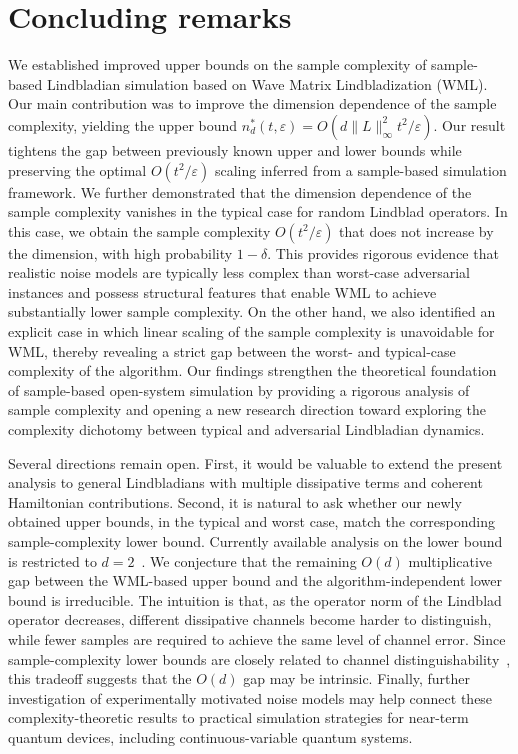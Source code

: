 \documentclass[superscriptaddress,amsmath,amssymb,aps,pra,letterpaper,tightenlines,notitlepages,12pt]{revtex4-2}
\begin{document}
\section{Concluding remarks} \label{sec:conclusion}
We established improved upper bounds on the sample complexity of sample-based Lindbladian simulation based on Wave Matrix Lindbladization (WML). Our main contribution was to improve the dimension dependence of the sample complexity, yielding the upper bound $n^\ast_d(t, \varepsilon) = O(d \| L\|_\infty^2 t^2/\varepsilon)$. Our result tightens the gap between previously known upper and lower bounds while preserving the optimal $O(t^2/\varepsilon)$ scaling inferred from a sample-based simulation framework. We further demonstrated that the dimension dependence of the sample complexity vanishes in the typical case for random Lindblad operators. In this case, we obtain the sample complexity $O(t^2/\varepsilon)$ that does not increase by the dimension, with high probability $1-\delta$. This provides rigorous evidence that realistic noise models are typically less complex than worst-case adversarial instances and possess structural features that enable WML to achieve substantially lower sample complexity. On the other hand, we also identified an explicit case in which linear scaling of the sample complexity is unavoidable for WML, thereby revealing a strict gap between the worst- and typical-case complexity of the algorithm. Our findings strengthen the theoretical foundation of sample-based open-system simulation by providing a rigorous analysis of sample complexity and opening a new research direction toward exploring the complexity dichotomy between typical and adversarial Lindbladian dynamics.

Several directions remain open. First, it would be valuable to extend the present analysis to general Lindbladians with multiple dissipative terms and coherent Hamiltonian contributions. Second, it is natural to ask whether our newly obtained upper bounds, in the typical and worst case, match the corresponding sample-complexity lower bound. Currently available analysis on the lower bound is restricted to $d=2$~\cite[Theorem~5]{go2025SamplebasedHamiltonianLindbladian}.
We conjecture that the remaining $O(d)$ multiplicative gap between the WML-based upper bound and the algorithm-independent lower bound is irreducible. The intuition is that, as the operator norm of the Lindblad operator decreases, different dissipative channels become harder to distinguish, while fewer samples are required to achieve the same level of channel error. Since sample-complexity lower bounds are closely related to channel distinguishability~\cite{wei2024SimulatingNoncompletelyPositive, go2025SamplebasedHamiltonianLindbladian}, this tradeoff suggests that the $O(d)$ gap may be intrinsic. Finally, further investigation of experimentally motivated noise models may help connect these complexity-theoretic results to practical simulation strategies for near-term quantum devices, including continuous-variable quantum systems.
\end{document}
